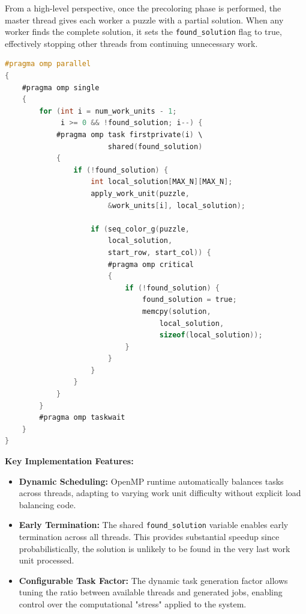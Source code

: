 From a high-level perspective, once the precoloring phase is performed, the master thread gives each worker a puzzle with a partial solution. When any worker finds the complete solution, it sets the \texttt{found\_solution} flag to true, effectively stopping other threads from continuing unnecessary work.

\begin{lstlisting}[language=C, caption=OpenMP task-based implementation, label={listing:omp_implementation}]
#pragma omp parallel
{
    #pragma omp single
    {
        for (int i = num_work_units - 1; 
             i >= 0 && !found_solution; i--) {
            #pragma omp task firstprivate(i) \
                        shared(found_solution)
            {
                if (!found_solution) {
                    int local_solution[MAX_N][MAX_N];
                    apply_work_unit(puzzle, 
                        &work_units[i], local_solution);
                    
                    if (seq_color_g(puzzle, 
                        local_solution, 
                        start_row, start_col)) {
                        #pragma omp critical
                        {
                            if (!found_solution) {
                                found_solution = true;
                                memcpy(solution, 
                                    local_solution, 
                                    sizeof(local_solution));
                            }
                        }
                    }
                }
            }
        }
        #pragma omp taskwait
    }
}
\end{lstlisting}

\textbf{Key Implementation Features:}
\begin{itemize}
    \item \textbf{Dynamic Scheduling:} OpenMP runtime automatically balances tasks across threads, adapting to varying work unit difficulty without explicit load balancing code.
    \item \textbf{Early Termination:} The shared \texttt{found\_solution} variable enables early termination across all threads. This provides substantial speedup since probabilistically, the solution is unlikely to be found in the very last work unit processed.
    \item \textbf{Configurable Task Factor:} The dynamic task generation factor allows tuning the ratio between available threads and generated jobs, enabling control over the computational "stress" applied to the system.
\end{itemize}

